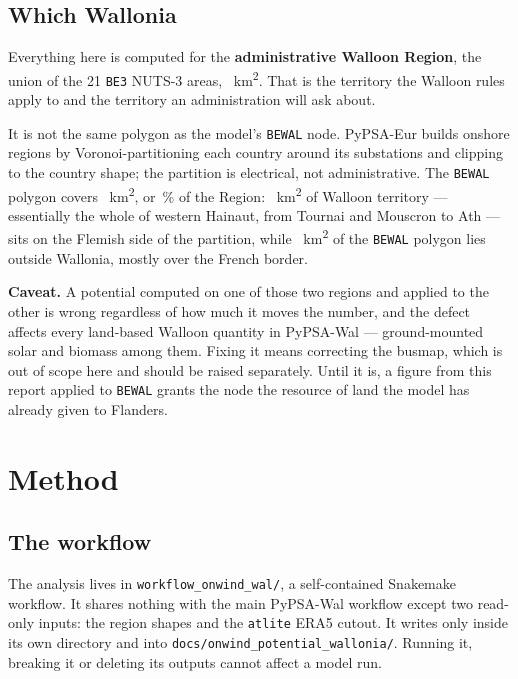 \documentclass[11pt,a4paper]{article}
\newcommand{\caveat}[1]{\par\medskip\noindent\colorbox{warn!8}{%
  \begin{minipage}{\dimexpr\linewidth-2\fboxsep}\textbf{Caveat.} #1\end{minipage}}\par\medskip}
\begin{document}
\subsection{Which Wallonia}\label{sec:region}

Everything here is computed for the \textbf{administrative Walloon Region}, the
union of the 21 \texttt{BE3} NUTS-3 areas, \adminArea{}~\si{\square\kilo\metre}.
That is the territory the Walloon rules apply to and the territory an
administration will ask about.

It is not the same polygon as the model's \texttt{BEWAL} node. PyPSA-Eur builds
onshore regions by Voronoi-partitioning each country around its substations and
clipping to the country shape; the partition is electrical, not administrative.
The \texttt{BEWAL} polygon covers \modelArea{}~\si{\square\kilo\metre}, or
\modelCoverage{}\,\% of the Region: \areaOutsideModel{}~\si{\square\kilo\metre}
of Walloon territory --- essentially the whole of western Hainaut, from Tournai
and Mouscron to Ath --- sits on the Flemish side of the partition, while
\areaOutsideWallonia{}~\si{\square\kilo\metre} of the \texttt{BEWAL} polygon lies
outside Wallonia, mostly over the French border.

\caveat{A potential computed on one of those two regions and applied to the other
is wrong regardless of how much it moves the number, and the defect affects every
land-based Walloon quantity in PyPSA-Wal --- ground-mounted solar and biomass
among them. Fixing it means correcting the busmap, which is out of scope here and
should be raised separately. Until it is, a figure from this report applied to
\texttt{BEWAL} grants the node the resource of land the model has already given
to Flanders.}

\section{Method}

\subsection{The workflow}

The analysis lives in \texttt{workflow\_onwind\_wal/}, a self-contained
Snakemake workflow. It shares nothing with the main PyPSA-Wal workflow except
two read-only inputs: the region shapes and the \texttt{atlite} ERA5 cutout. It
writes only inside its own directory and into
\texttt{docs/onwind\_potential\_wallonia/}. Running it, breaking it or deleting
its outputs cannot affect a model run.
\end{document}
